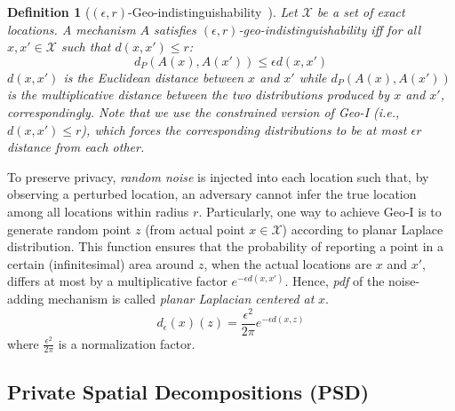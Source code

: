 \documentclass{USC-Thesis}
\numberwithin{equation}{chapter}
\begin{document}
\newtheorem{geo-indistinguishability}[definition]{Definition}\label{geo-indistinguishability}
\begin{geo-indistinguishability}[$(\epsilon,r)$-Geo-indistinguishability~\cite{andres2013geo}]
Let $\mathcal{X}$ be a set of exact locations. A mechanism $A$ satisfies $(\epsilon,r)$-geo-indistinguishability iff for all $\mathit{x,x'\in \mathcal{X}}$ such that $\mathit{d(x,x')\le r}$:
$$d_P(A(x), A(x'))\le \epsilon d(x, x')$$
$d(x,x')$ is the Euclidean distance between $x$ and $x'$ while $d_P(A(x), A(x'))$ is the multiplicative distance between the two distributions produced by $x$ and $x'$, correspondingly. Note that we use the \emph{constrained} version of Geo-I (i.e., $\mathit{d(x,x')\le r}$), which forces the corresponding distributions to be at most $\epsilon r$ distance from each other.
\end{geo-indistinguishability}

To preserve privacy, \emph{random noise} is injected into each location such that, by observing a perturbed location, an adversary cannot infer the true location among all locations within radius $r$.
Particularly, one way to achieve Geo-I is to generate random point $z$ (from actual point $x\in \mathcal{X}$) according to planar Laplace distribution. This function ensures that the probability of reporting a point in a certain (infinitesimal) area around $z$, when the actual locations are $x$ and $x'$, differs at most by a multiplicative factor $e^{-\epsilon d(x,x')}$. Hence, \emph{pdf} of the noise-adding mechanism is called \emph{planar Laplacian centered at} $x$.
\begin{equation}
d_\epsilon(x)(z)=\frac{\epsilon^2}{2\pi}e^{-\epsilon d(x,z)}
\label{eq:pdf}
\end{equation}
where $\frac{\epsilon^2}{2\pi}$ is a normalization factor.


\subsection{Private Spatial Decompositions (PSD)}
\label{sec:PSD-prelim}
\end{document}
